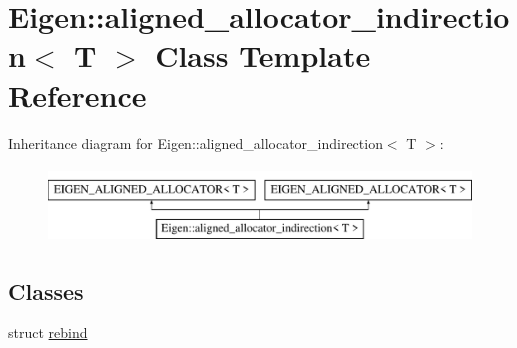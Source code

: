 \hypertarget{class_eigen_1_1aligned__allocator__indirection}{}\section{Eigen\+:\+:aligned\+\_\+allocator\+\_\+indirection$<$ T $>$ Class Template Reference}
\label{class_eigen_1_1aligned__allocator__indirection}
Inheritance diagram for Eigen\+:\+:aligned\+\_\+allocator\+\_\+indirection$<$ T $>$\+:\begin{figure}[H]
\begin{center}
\leavevmode
\includegraphics[height=2.000000cm]{class_eigen_1_1aligned__allocator__indirection}
\end{center}
\end{figure}
\subsection*{Classes}
\begin{DoxyCompactItemize}
\item 
struct \hyperlink{struct_eigen_1_1aligned__allocator__indirection_1_1rebind}{rebind}
\end{DoxyCompactItemize}
